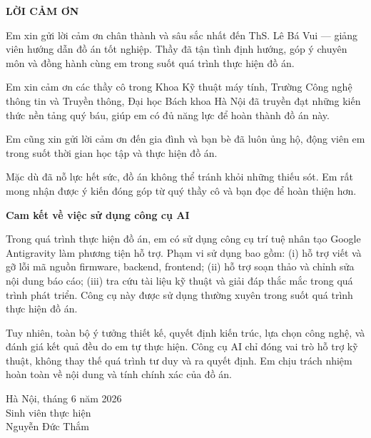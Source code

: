 \documentclass[../DoAn.tex]{subfiles}
\begin{document}
\begin{center}
    \Large{\textbf{LỜI CẢM ƠN}}\\
\end{center}
\vspace{1cm}
Em xin gửi lời cảm ơn chân thành và sâu sắc nhất đến ThS. Lê Bá Vui — giảng viên hướng dẫn đồ án tốt nghiệp. Thầy đã tận tình định hướng, góp ý chuyên môn và đồng hành cùng em trong suốt quá trình thực hiện đồ án.

Em xin cảm ơn các thầy cô trong Khoa Kỹ thuật máy tính, Trường Công nghệ thông tin và Truyền thông, Đại học Bách khoa Hà Nội đã truyền đạt những kiến thức nền tảng quý báu, giúp em có đủ năng lực để hoàn thành đồ án này.

Em cũng xin gửi lời cảm ơn đến gia đình và bạn bè đã luôn ủng hộ, động viên em trong suốt thời gian học tập và thực hiện đồ án.

Mặc dù đã nỗ lực hết sức, đồ án không thể tránh khỏi những thiếu sót. Em rất mong nhận được ý kiến đóng góp từ quý thầy cô và bạn đọc để hoàn thiện hơn.

\vspace{0.5cm}
\noindent\textbf{Cam kết về việc sử dụng công cụ AI}

\noindent Trong quá trình thực hiện đồ án, em có sử dụng công cụ trí tuệ nhân tạo Google Antigravity làm phương tiện hỗ trợ. Phạm vi sử dụng bao gồm: (i) hỗ trợ viết và gỡ lỗi mã nguồn firmware, backend, frontend; (ii) hỗ trợ soạn thảo và chỉnh sửa nội dung báo cáo; (iii) tra cứu tài liệu kỹ thuật và giải đáp thắc mắc trong quá trình phát triển. Công cụ này được sử dụng thường xuyên trong suốt quá trình thực hiện đồ án.

\noindent Tuy nhiên, toàn bộ ý tưởng thiết kế, quyết định kiến trúc, lựa chọn công nghệ, và đánh giá kết quả đều do em tự thực hiện. Công cụ AI chỉ đóng vai trò hỗ trợ kỹ thuật, không thay thế quá trình tư duy và ra quyết định. Em chịu trách nhiệm hoàn toàn về nội dung và tính chính xác của đồ án.

\begin{flushright}
Hà Nội, tháng 6 năm 2026\\
Sinh viên thực hiện\\[1.5cm]
Nguyễn Đức Thắm
\end{flushright}
\end{document}
